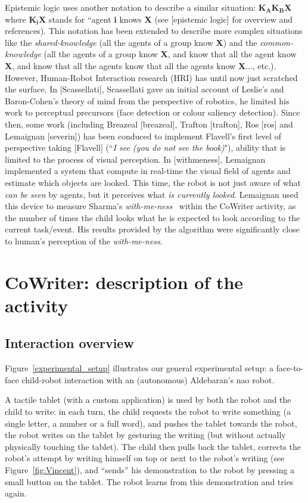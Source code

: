 \documentclass[10pt,a4paper,twocolumn]{article}
\begin{document}
Epistemic logic uses another notation to describe a similar situation: $\textbf{K}_{\textbf{A}}\textbf{K}_{\textbf{B}}\textbf{X}$ where $\textbf{K}_{\textbf{i}}\textbf{X}$ stands for ``agent \textbf{i} knows \textbf{X} (see [epistemic logic] for overview and references). This notation has been extended to describe more complex situations like the \textit{shared-knowledge} (all the agents of a group know \textbf{X}) and the \textit{common-knowledge} (all the agents of a group know \textbf{X}, and know that all the agent know \textbf{X}, and know that all the agents know that all the agents know \textbf{X}..., etc.). 
However, Human-Robot Interaction research (HRI) has until now just scratched the surface. In [Scassellati], Scassellati gave an initial account of Leslie's and Baron-Cohen's theory of mind from the perspective of robotics, he limited his work to perceptual precursors (face detection or colour saliency detection). Since then, some work (including Breazeal [breazeal], Trafton [trafton], Ros [ros] and Lemaignan [severin]) has been conduced to implement Flavell's first level of perspective taking [Flavell] (``\textit{I see (you do not see the book)}"), ability that is limited to the process of visual perception.
In [withmeness], Lemaignan implemented a system that compute in real-time the visual field of agents and estimate which objects are looked. This time, the robot is not just aware of what \textit{can be seen} by agents, but it perceives what \textit{is currently looked}. Lemaignan used this device to measure Sharma's \textit{with-me-ness}~\cite{sharma2014me} within the CoWriter activity, as the number of times the child looks what he is expected to look according to the current task/event. His results provided by the algorithm were significantly close to human's perception of the \textit{with-me-ness}.


\section{CoWriter: description of the activity}
\subsection{Interaction overview}
Figure~\ref{experimental_setup} illustrates our general experimental setup: a
face-to-face child-robot interaction with an (autonomous) Aldebaran's {\sc nao}
robot.

A tactile tablet (with a custom application) is used by both the robot and the
child to write: in each turn, the child requests the robot to write
something (a single letter, a number or a full word), and pushes the tablet
towards the robot, the robot writes on the tablet by gesturing the writing (but
without actually physically touching the tablet). The child then pulls back the
tablet, corrects the robot's attempt by writing himself on top or next to
the robot's writing (see Figure~\ref{fig:Vincent}), and ``sends'' his
demonstration to the robot by pressing a small button on the tablet. The robot
learns from this demonstration and tries again.
\end{document}
